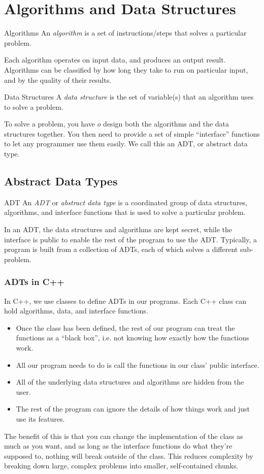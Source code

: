 \documentclass[class=article, crop=false]{standalone}
\begin{document}
  \tableofcontents
  \newpage
  \section{Algorithms and Data Structures}
  \begin{definition}{Algorithms}
    An \emph{algorithm} is a set of instructions/steps that solves a particular problem.
  \end{definition}
  Each algorithm operates on input data, and produces an output result. Algorithms can be classified by how long they take to run on particular input, and by the quality of their results. 
  \begin{definition}{Data Structures}
    A \emph{data structure} is the set of variable(s) that an algorithm uses to solve a problem.
  \end{definition}
  To solve a problem, you have $o$ design both the algorithms and the data structures together. You then need to provide a set of simple ``interface'' functions to let any programmer use them easily. We call this an ADT, or abstract data type.
  \subsection{Abstract Data Types}
  \begin{definition}{ADT}
    An \emph{ADT} or \emph{abstract data type} is a coordinated group of data structures, algorithms, and interface functions that is used to solve a particular problem.
  \end{definition}
  In an ADT, the data structures and algorithms are kept secret, while the interface is public to enable the rest of the program to use the ADT. Typically, a program is built from a collection of ADTs, each of which solves a different sub-problem.
  \subsubsection{ADTs in C++}
  In C++, we use classes to define ADTs in our programs. Each C++ class can hold algorithms, data, and interface functions.
  \begin{itemize}
    \item Once the class has been defined, the rest of our program can treat the functions as a ``black box'', i.e. not knowing how exactly how the functions work.
    \item All our program needs to do is call the functions in our class' public interface.
    \item All of the underlying data structures and algorithms are hidden from the user.
    \item The rest of the program can ignore the details of how things work and just use its features.
  \end{itemize}
  \begin{note}{}
    The benefit of this is that you can change the implementation of the class as much as you want, and as long as the interface functions do what they're supposed to, nothing will break outside of the class. This reduces complexity by breaking down large, complex problems into smaller, self-contained chunks.
  \end{note}
  \newpage
\end{document}
